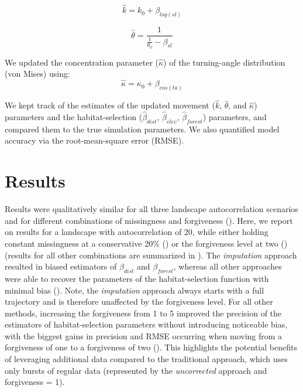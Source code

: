\documentclass[../FinalThesis.tex]{subfiles}
\begin{document}
$$
\hat{k} = k_0 + \beta_{log(sl)}
$$

$$
\hat{\theta} = \frac{1}{\frac{1}{\theta_0} - \beta_{sl}}
$$

\noindent We updated the concentration parameter ($\hat{\kappa}$) of the
turning-angle distribution (von Mises) using:
$$
\hat{\kappa} = \kappa_0 + \beta_{cos(ta)}
$$

\noindent We kept track of the  estimates of the updated movement  ($\hat{k}$,
$\hat{\theta}$, and $\hat{\kappa}$) parameters and  the habitat-selection
($\hat{\beta}_{dist}$, $\hat{\beta}_{elev}$, $\hat{\beta}_{forest}$) parameters,
and compared them to the true simulation parameters. We also quantified model
accuracy via the root-mean-square error (RMSE).

\section{Results}

Results were qualitatively similar for all three landscape autocorrelation
scenarios and for different combinations of missingness and forgiveness
(). Here, we report on results for a landscape with
autocorrelation of 20, while either holding constant missingness at a
conservative 20\% () or the forgiveness level
at two () (results for all other combinations
are summarized in ). The \textit{imputation} approach
resulted in biased estimators of $\beta_{dist}$ and $\beta_{forest}$, whereas
all other approaches were able to recover the parameters of the
habitat-selection function with minimal bias
(). Note, the \textit{imputation} approach
always starts with a full trajectory and is therefore unaffected by the
forgiveness level. For all other methods, increasing the forgiveness from 1 to 5
improved the precision of the estimators of habitat-selection parameters without
introducing noticeable bias, with the biggest gains in precision and RMSE
occurring when moving from a forgiveness of one to a forgiveness of two
(). This highlights the potential benefits of
leveraging additional data compared to the traditional approach, which uses only
bursts of regular data (represented by the \textit{uncorrected} approach and
forgiveness = 1).
\end{document}
